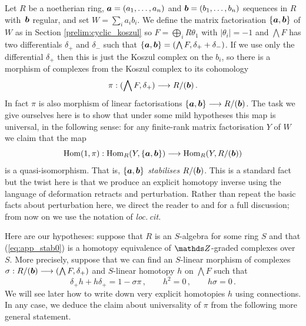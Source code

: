 \documentclass{compositio}
\theoremstyle{definition}
\numberwithin{equation}{section}
\def\Hom{\operatorname{Hom}}
\begin{document}
Let $R$ be a noetherian ring, $\boldsymbol{a} = (a_1,\ldots,a_n)$ and $\boldsymbol{b} = (b_1, \ldots, b_n)$ sequences in $R$ with~$\boldsymbol{b}$ regular, and set $W = \sum_i a_i b_i$. We define the matrix factorisation $\{ \boldsymbol{a}, \boldsymbol{b} \}$ of $W$ as in Section \ref{prelim:cyclic_koszul} so $F = \bigoplus_i R \theta_1$ with $|\theta_i| = -1$ and $\bigwedge F$ has two differentials $\delta_+$ and $\delta_{-}$ such that $\{ \boldsymbol{a}, \boldsymbol{b} \} = (\bigwedge F, \delta_+ + \delta_{-})$. If we use only the differential $\delta_+$ then this is just the Koszul complex on the $b_i$, so there is a morphism of complexes from the Koszul complex to its cohomology
\begin{equation}\label{eq:app_stab0}
\pi: ( \bigwedge F, \delta_+ ) \longrightarrow R/(\boldsymbol{b})\,.
\end{equation}
In fact $\pi$ is also morphism of linear factorisations $\{ \boldsymbol{a}, \boldsymbol{b} \} \longrightarrow R/(\boldsymbol{b})$. The task we give ourselves here is to show that under some mild hypotheses this map is universal, in the following sense: for any finite-rank matrix factorisation $Y$ of $W$ we claim that the map
\begin{equation}\label{eq:app_stab1}
\Hom(1, \pi): \Hom_R(Y, \{ \ba, \bb \}) \lto \Hom_R(Y, R/(\bb))
\end{equation}
is a quasi-isomorphism. That is, $\{ \boldsymbol{a}, \boldsymbol{b} \}$ \emph{stabilises} $R/(\boldsymbol{b})$. This is a standard fact but the twist here is that we produce an explicit homotopy inverse using the language of deformation retracts and perturbation. Rather than repeat the basic facts about perturbation here, we direct the reader to \cite[Section 5]{dm1102.2957} and \cite{c0403266} for a full discussion; from now on we use the notation of \emph{loc.\,cit.}

Here are our hypotheses: suppose that $R$ is an $S$-algebra for some ring $S$ and that (\ref{eq:app_stab0}) is a homotopy equivalence of $\ZZ$-graded complexes over $S$. More precisely, suppose that we can find an $S$-linear morphism of complexes $\sigma: R/(\boldsymbol{b}) \longrightarrow (\bigwedge F, \delta_+)$ and $S$-linear homotopy $h$ on $\bigwedge F$ such that
\begin{equation}\label{eq:homotopycond}
\delta_+ h + h \delta_+ = 1 - \sigma \pi\,, \qquad h^2 = 0\,, \qquad h \sigma = 0\,.
\end{equation}
We will see later how to write down very explicit homotopies $h$ using connections. In any case, we deduce the claim about universality of $\pi$ from the following more general statement.
\end{document}
